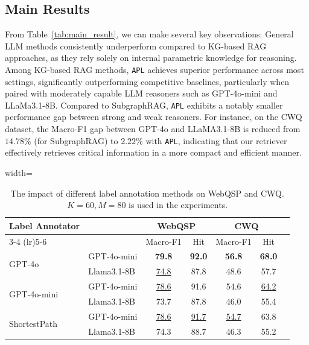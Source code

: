 \documentclass{article}
\theoremstyle{plain}
\theoremstyle{definition}
\theoremstyle{remark}
\newcommand{\proj}{\texttt{\scalebox{1.03}{R}APL}}
\begin{document}
\subsection{Main Results}
From Table~\ref{tab:main_result}, we can make several key observations:
 General LLM methods consistently underperform compared to KG-based RAG approaches, as they rely solely on internal parametric knowledge for reasoning.
 Among KG-based RAG methods, \proj{} achieves superior performance across most settings, significantly outperforming competitive baselines, particularly when paired with moderately capable LLM reasoners such as GPT-4o-mini and LLaMa3.1-8B.
 Compared to SubgraphRAG, \proj{} exhibits a notably smaller performance gap between strong and weak reasoners. For instance, on the CWQ dataset, the Macro-F1 gap between GPT-4o and LLaMA3.1-8B is reduced from $14.78\%$ (for SubgraphRAG) to $2.22\%$ with \proj{}, indicating that our retriever effectively retrieves critical information in a more compact and efficient manner. 
\begin{table}
\caption{
 The impact of different label annotation methods on WebQSP and CWQ. $K=60,M=80$ is used in the experiments.
}
\label{tab:teacher_supervision}
\centering
\begin{adjustbox}{width=\linewidth}
\begin{tabular}{llccccc}
\toprule
\multirow{2}{*}{Label Annotator} &  & \multicolumn{2}{c}{WebQSP} & \multicolumn{2}{c}{CWQ} \\
\cmidrule(lr){3-4} \cmidrule(lr){5-6}
 & & Macro-F1 & Hit & Macro-F1 & Hit \\
\midrule
\multirow{2}{*}{GPT-4o} 
  & GPT-4o-mini     & \textbf{79.8}  & \textbf{92.0}  & \textbf{56.8} & \textbf{68.0} \\
  & Llama3.1-8B    & \underline{74.8} & 87.8  & 48.6 & 57.7 \\
\midrule
\multirow{2}{*}{GPT-4o-mini} 
  & GPT-4o-mini     & \underline{78.6} & 91.6  & 54.6 & \underline{64.2} \\
  & Llama3.1-8B    & 73.7 & 87.8  & 46.0 & 55.4 \\
\midrule
\multirow{2}{*}{ShortestPath} 
  & GPT-4o-mini     & \underline{78.6} & \underline{91.7}  & \underline{54.7} & 63.8 \\
  & Llama3.1-8B    & 74.3 & 88.7  & 46.3 & 55.2 \\
\bottomrule
\end{tabular}
\end{adjustbox}
\end{table}
\end{document}
